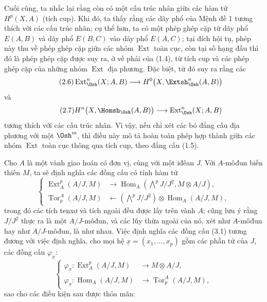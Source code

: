 Cuối cùng, ta nhắc lại rằng còn có một cấu trúc nhân giữa các hàm tử
$H^{p}(X,A)$ (tích cup). Khi đó, ta thấy rằng các dãy phổ của
Mệnh đề 1 tương thích với các cấu trúc nhân; cụ thể hơn,
ta có một phép ghép cặp từ dãy phổ $E(A,B)$ và dãy phổ
$E(B,C)$ vào dãy phổ $E(A,C)$; tại đích hội tụ, phép này
thu về phép ghép cặp giữa các nhóm $\operatorname{Ext}$ toàn cục, còn tại
số hạng đầu thì đó là phép ghép cặp được suy ra, ở vế phải của (1.4), từ
tích cup và các phép ghép cặp của những nhóm $\operatorname{Ext}$ địa phương. Đặc biệt, từ đó suy ra
rằng các 
\begin{equation}\tag{2.6}
  \operatorname{Ext}_{\Osh}^{n}(X;A,B)
  \longrightarrow H^{0}\bigl(X,\Extsh_{\Osh}^{n}(A,B)\bigr)
\end{equation}
và
\begin{equation}\tag{2.7}
  H^{n}\bigl(X,\Homsh_{\Osh}(A,B)\bigr)
  \longrightarrow\operatorname{Ext}_{\Osh}^{n}(X;A,B)
\end{equation}
tương thích với các cấu trúc nhân. Vì vậy, nếu chỉ xét
các bó đẳng cấu địa phương với một $\Osh^{m}$, thì điều này mô tả hoàn toàn
phép hợp thành giữa các nhóm $\operatorname{Ext}$ toàn cục thông qua tích cup, theo
đẳng cấu (1.5).


Cho $A$ là một vành giao hoán có đơn vị, cùng với một iđêan $J$. Với
$A$-môđun biến thiên $M$, ta sẽ định nghĩa các đồng cấu có tính hàm tử
\begin{equation}\tag{3.1}
\left\{
\begin{aligned}
\operatorname{Ext}_{A}^{p}(A/J,M)
  &\longrightarrow
  \operatorname{Hom}_{A}\!\left(\bigwedge^{p}J/J^{2},M\otimes A/J\right),\\
\operatorname{Tor}_{p}^{A}(A/J,M)
  &\longleftarrow
  \left(\bigwedge^{p}J/J^{2}\right)
  \otimes\operatorname{Hom}_{A}(A/J,M),
\end{aligned}
\right.
\end{equation}
trong đó các tích tenxơ và tích ngoài đều được lấy trên vành $A$; cũng lưu ý
rằng $J/J^{2}$ thực ra là một $A/J$-môđun, và các lũy thừa
ngoài của nó, xét như $A$-môđun hay như $A/J$-môđun, là như nhau.
Việc định nghĩa các đồng cấu (3.1) tương đương với việc định nghĩa, cho mọi
hệ $\underline{x}=(x_1,\ldots,x_p)$ gồm các phần tử của $J$, các đồng cấu
$\varphi_{\underline{x}}$:
\begin{equation}\tag{3.2}
\left\{
\begin{aligned}
\varphi_{\underline{x}}:
  \operatorname{Ext}_{A}^{p}(A/J,M)&\longrightarrow M\otimes A/J,\\
\varphi_{\underline{x}}:
  \operatorname{Hom}_{A}(A/J,M)&\longrightarrow
  \operatorname{Tor}_{p}^{A}(A/J,M),
\end{aligned}
\right.
\end{equation}
sao cho các điều kiện sau được thỏa mãn:


